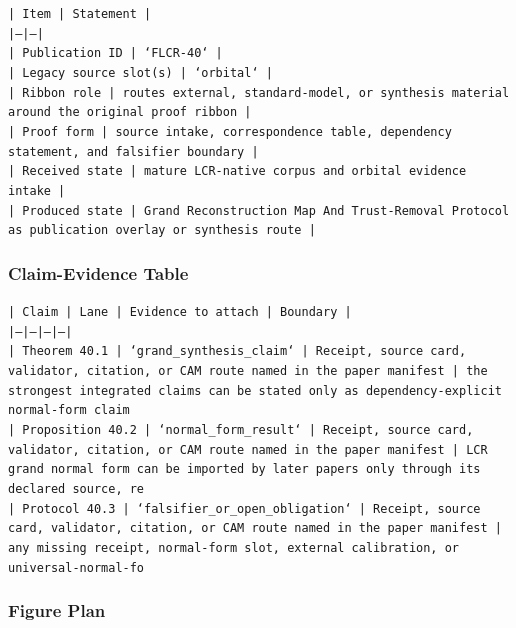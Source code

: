 \documentclass[11pt]{article}
\begin{document}
\noindent\texttt{| Item | Statement |}\\
\noindent\texttt{|---|---|}\\
\noindent\texttt{| Publication ID | `FLCR-40` |}\\
\noindent\texttt{| Legacy source slot(s) | `orbital` |}\\
\noindent\texttt{| Ribbon role | routes external, standard-model, or synthesis material around the original proof ribbon |}\\
\noindent\texttt{| Proof form | source intake, correspondence table, dependency statement, and falsifier boundary |}\\
\noindent\texttt{| Received state | mature LCR-native corpus and orbital evidence intake |}\\
\noindent\texttt{| Produced state | Grand Reconstruction Map And Trust-Removal Protocol as publication overlay or synthesis route |}\\

\subsubsection*{Claim-Evidence Table}

\noindent\texttt{| Claim | Lane | Evidence to attach | Boundary |}\\
\noindent\texttt{|---|---|---|---|}\\
\noindent\texttt{| Theorem 40.1 | `grand\_synthesis\_claim` | Receipt, source card, validator, citation, or CAM route named in the paper manifest | the strongest integrated claims can be stated only as dependency-explicit normal-form claim}\\
\noindent\texttt{| Proposition 40.2 | `normal\_form\_result` | Receipt, source card, validator, citation, or CAM route named in the paper manifest | LCR grand normal form can be imported by later papers only through its declared source, re}\\
\noindent\texttt{| Protocol 40.3 | `falsifier\_or\_open\_obligation` | Receipt, source card, validator, citation, or CAM route named in the paper manifest | any missing receipt, normal-form slot, external calibration, or universal-normal-fo}\\

\subsubsection*{Figure Plan}
\end{document}
